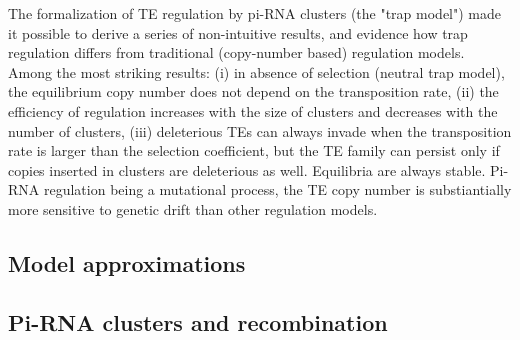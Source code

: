 \documentclass[10pt,a4paper]{article}
\begin{document}
The formalization of TE regulation by pi-RNA clusters (the "trap model") made it possible to derive a series of non-intuitive results, and evidence how trap regulation differs from traditional (copy-number based) regulation models. Among the most striking results: (i) in absence of selection (neutral trap model), the equilibrium copy number does not depend on the transposition rate, (ii) the efficiency of regulation increases with the size of clusters and decreases with the number of clusters, (iii) deleterious TEs can always invade when the transposition rate is larger than the selection coefficient, but the TE family can persist only if copies inserted in clusters are deleterious as well. Equilibria are always stable. Pi-RNA regulation being a mutational process, the TE copy number is substiantially more sensitive to genetic drift than other regulation models. 


\subsection{Model approximations}

\subsection{Pi-RNA clusters and recombination}


\printbibliography


\newpage 
\end{document}
